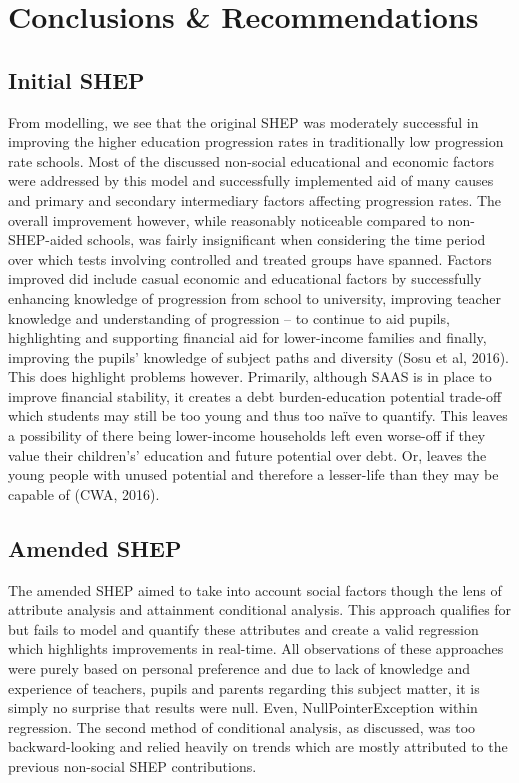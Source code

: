 \documentclass[11pt, english]{article}
\begin{document}
\newpage

\section{Conclusions \& Recommendations}

	\subsection{Initial SHEP}

	From modelling, we see that the original SHEP was moderately successful in improving the higher education progression rates in traditionally low progression rate schools. Most of the discussed non-social educational and economic factors were addressed by this model and successfully implemented aid of many causes and primary and secondary intermediary factors affecting progression rates. The overall improvement however, while reasonably noticeable compared to non-SHEP-aided schools, was fairly insignificant when considering the time period over which tests involving controlled and treated groups have spanned. Factors improved did include casual economic and educational factors by successfully enhancing knowledge of progression from school to university, improving teacher knowledge and understanding of progression – to continue to aid pupils, highlighting and supporting financial aid for lower-income families and finally, improving the pupils’ knowledge of subject paths and diversity (Sosu et al, 2016).\\

	This does highlight problems however. Primarily, although SAAS is in place to improve financial stability, it creates a debt burden-education potential trade-off which students may still be too young and thus too naïve to quantify. This leaves a possibility of there being lower-income households left even worse-off if they value their children’s’ education and future potential over debt. Or, leaves the young people with unused potential and therefore a lesser-life than they may be capable of (CWA, 2016).

	\subsection{Amended SHEP}

	The amended SHEP aimed to take into account social factors though the lens of attribute analysis and attainment conditional analysis. This approach qualifies for but fails to model and quantify these attributes and create a valid regression which highlights improvements in real-time. All observations of these approaches were purely based on personal preference and due to lack of knowledge and experience of teachers, pupils and parents regarding this subject matter, it is simply no surprise that results were null. Even, NullPointerException within regression. The second method of conditional analysis, as discussed, was too backward-looking and relied heavily on trends which are mostly attributed to the previous non-social SHEP contributions.\\
\end{document}
